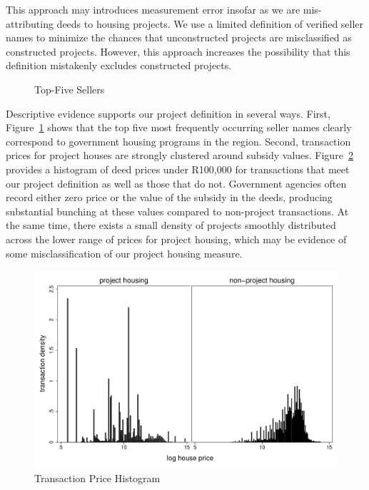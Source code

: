 \documentclass[12pt]{article}
\begin{document}
This approach may introduces measurement error insofar as we are mis-attributing deeds to housing projects.  We use a limited definition of verified seller names to minimize the chances that unconstructed projects are misclassified as constructed projects.  However, this approach increases the possibility that this definition mistakenly excludes constructed projects.
\begin{figure}
\caption{Top-Five Sellers}\label{figure:topfivesellers}
\centering

\end{figure}
Descriptive evidence supports our project definition in several ways.  First, Figure~\ref{figure:topfivesellers} shows that the top five most frequently occurring seller names clearly correspond to government housing programs in the region.  Second, transaction prices for project houses are strongly clustered around subsidy values.  Figure~\ref{figure:transactionhist} provides a histogram of deed prices under R100,000 for transactions that meet our project definition as well as those that do not.  Government agencies often record either zero price or the value of the subsidy in the deeds, producing substantial bunching at these values compared to non-project transactions.  At the same time, there exists a small density of projects smoothly distributed across the lower range of prices for project housing, which may be evidence of some misclassification of our project housing measure.
\begin{figure}
\caption{Transaction Price Histogram}\label{figure:transactionhist}
\centering
\includegraphics[scale=.4]{figures/summary_pricedist.pdf}
\end{figure}
\end{document}
